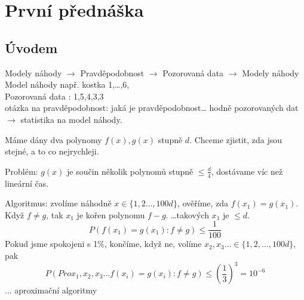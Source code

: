 \documentclass[../main.tex]{subfiles}
\begin{document}
\section{První přednáška}

\subsection{Úvodem}

Modely náhody $\rightarrow$ Pravděpodobnost $\rightarrow$ Pozorovaná data 
$\rightarrow$ Modely náhody\\
Model náhody např. kostka 1,\dots,6,\\
Pozorovaná data : 1,5,4,3,3\\
otázka na pravděpodobnost: jaká je pravděpodobnost\dots
hodně pozorovaných dat $\rightarrow$ statistika na model náhody.

\begin{example}
    Máme dány dva polynomy $f(x),g(x)$ stupně $d$. Chceme zjistit, zda jsou stejné, 
    a to co nejrychleji.

    \noindent
    Problém: $g(x)$ je součin několik polynomů stupně $\leq \frac{d}{4}$, 
    dostávame víc než lineární čas.\\
\end{example}

\begin{solution}
    Algoritmus: zvolíme náhodně $x \in \{1,2\dots,100d\}$, ověříme, 
    zda $f(x_1) = g(x_1)$. Když $f \neq g$, tak $x_1$ je kořen polynomu $f-g$.
    \dots takových $x_1$ je  $\leq d$.\\
    \[P(f(x_1)=g(x_1) : f\neq g) \leq \frac{1}{100}\]
    Pokud jsme spokojeni s 1\%, končíme, když ne, volíme
    $x_2,x_3... \in \{1,2,\dots,100d\}$, pak 
    \[P(Pro x_1,x_2,x_3\dots  f(x_i)=g(x_i) : f\neq g) \leq 
    \left(\frac{1}{3}\right)^3 = 10^{-6}\]
    ... aproximační algoritmy
\end{solution}
\end{document}
